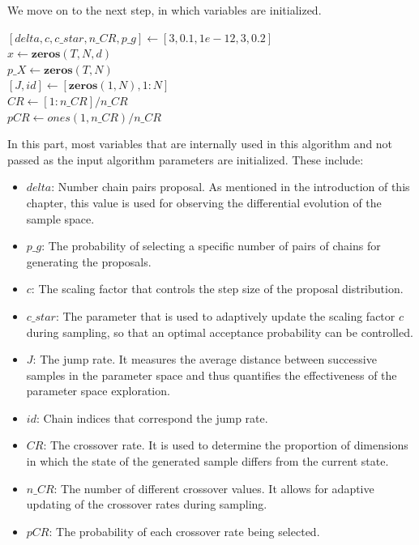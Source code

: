 We move on to the next step, in which variables are initialized.\\

\begin{algorithm}[H]
$[delta, c, c\_star, n\_CR, p\_g] \gets [3, 0.1, 1e-12, 3, 0.2]$\\
$x \gets \textbf{zeros}(T, N, d)$\\
$p\_X \gets \textbf{zeros}(T, N)$\\
$[J, id] \gets [\textbf{zeros}(1, N), 1:N]$\\
$CR \gets [1:n\_CR] / n\_CR$\\
$pCR \gets ones(1, n\_CR) / n\_CR$\\
\end{algorithm}

In this part, most variables that are internally used in this algorithm and not passed as the input algorithm parameters are initialized. These include:
\begin{itemize}
    \item $delta$: Number chain pairs proposal. As mentioned in the introduction of this chapter, this value is used for observing the differential evolution of the sample space.
    \item $p\_g$: The probability of selecting a specific number of pairs of chains for generating the proposals.
    \item $c$: The scaling factor that controls the step size of the proposal distribution.
    \item $c\_star$: The parameter that is used to adaptively update the scaling factor $c$ during sampling, so that an optimal acceptance probability can be controlled.
    \item $J$: The jump rate. It measures the average distance between successive samples in the parameter space and thus quantifies the effectiveness of the parameter space exploration.
    \item $id$: Chain indices that correspond the jump rate.
    \item $CR$: The crossover rate. It is used to determine the proportion of dimensions in which the state of the generated sample differs from the current state.
    \item $n\_CR$: The number of different crossover values. It allows for adaptive updating of the crossover rates during sampling.
    \item $pCR$: The probability of each crossover rate being selected.
\end{itemize}

